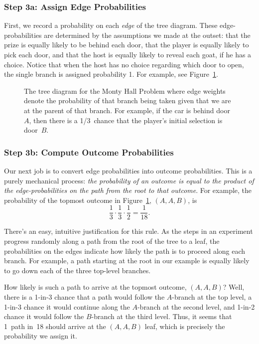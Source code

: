 \subsubsection{Step 3a: Assign Edge Probabilities}

First, we record a probability on each \emph{edge} of the tree
diagram.  These edge-probabilities are determined by the assumptions
we made at the outset: that the prize is equally likely to be behind
each door, that the player is equally likely to pick each door, and
that the host is equally likely to reveal each goat, if he has a
choice.  Notice that when the host has no choice regarding which door
to open, the single branch is assigned probability 1.  For example,
see Figure~\ref{fig:14A5}.

\begin{figure}[h]


\caption{The tree diagram for the Monty Hall Problem where edge
  weights denote the probability of that branch being taken given that
  we are at the parent of that branch.  For example, if the car is
  behind door~$A$, then there is a 1/3~chance that the player's
  initial selection is door~$B$.}

\label{fig:14A5}

\end{figure}

\subsubsection{Step 3b: Compute Outcome Probabilities}

Our next job is to convert edge probabilities into outcome
probabilities.  This is a purely mechanical process: \emph{the
  probability of an outcome is equal to the product of the
  edge-probabilities on the path from the root to that outcome}.  For
example, the probability of the topmost outcome in
Figure~\ref{fig:14A5}, $(A, A, B)$, is
\[
\frac{1}{3} \cdot \frac{1}{3} \cdot \frac{1}{2} = \frac{1}{18}.
\]

There's an easy, intuitive justification for this rule.  As the steps in
an experiment progress randomly along a path from the root of the tree to
a leaf, the probabilities on the edges indicate how likely the path is to
proceed along each branch.  For example, a path starting at the root in
our example is equally likely to go down each of the three top-level
branches.

How likely is such a path to arrive at the topmost outcome, $(A, A,
B)$?  Well, there is a 1-in-3 chance that a path would follow the
$A$-branch at the top level, a 1-in-3 chance it would continue along
the $A$-branch at the second level, and 1-in-2 chance it would follow
the $B$-branch at the third level.  Thus, it seems that 1~path in~18
should arrive at the $(A, A, B)$ leaf, which is precisely the
probability we assign it.

